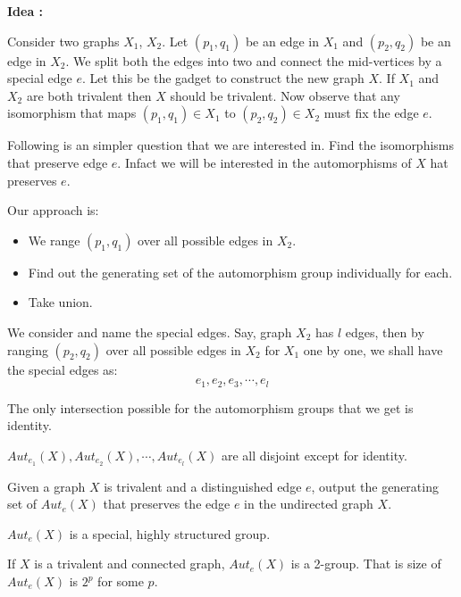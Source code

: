 \textbf{Idea :}

Consider two graphs $X_1$, $X_2$. Let $(p_1,q_1)$ be an edge in $X_1$ and $(p_2,q_2)$ be an edge in $X_2$. We split both the edges  into two and connect the mid-vertices by a special edge $e$. Let this be the gadget to construct the new graph $X$. If $X_1$ and $X_2$ are both trivalent then $X$ should be trivalent. Now observe that any isomorphism that maps $(p_1,q_1)\in X_1$ to $(p_2,q_2)\in X_2$ must fix the edge $e$. 

Following is an simpler question that we are interested in. Find the isomorphisms that preserve edge $e$. Infact we will be interested in the automorphisms of $X$ hat preserves $e$. 

Our approach is:
\begin{itemize}
\item We range $(p_1,q_1)$ over all possible edges in $X_2$. 
\item Find out the generating set of the automorphism group individually for each. 
\item Take union.
\end{itemize}
  
  We consider and name the special edges. Say, graph $X_2$ has $l$ edges, then by ranging $(p_2,q_2)$ over all possible edges in $X_2$ for $X_1$ one by one, we shall have the special edges as:
   \[ e_1, e_2 , e_3,\cdots,e_l\]
  \begin{observation} The only intersection possible for the automorphism groups that we get is identity.
  \end{observation}
  $ Aut_{e_{1}}(X), Aut_{e_{2}}(X),\cdots,Aut_{e_{l}}(X)$ are all disjoint except for identity.
  
 \begin{problem} Given a graph $X$ is trivalent 
 and a distinguished edge $e$, output the generating set of $Aut_e(X)$ that preserves the edge $e$ in the undirected graph $X$.
  \end{problem}

$Aut_e(X)$ is a special, highly structured group.

\begin{theorem} If $X$ is a trivalent and connected graph, $Aut_e(X)$ is a 2-group. That is size of  $Aut_e(X)$ is $2^p$ for some $p$.
\end{theorem}






